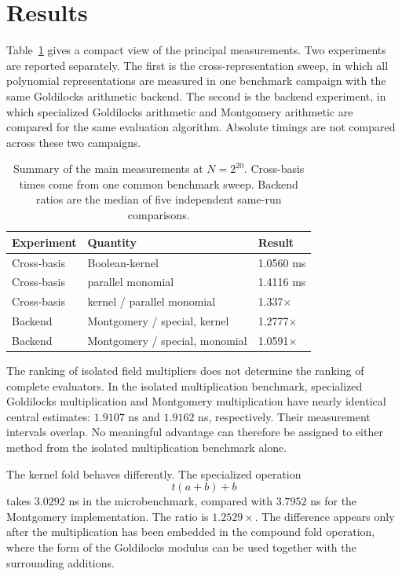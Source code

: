 
\section{Results}
\label{sec:results}

Table~\ref{tab:results-summary} gives a compact view of the principal
measurements.  Two experiments are reported separately.  The first is the
cross-representation sweep, in which all polynomial representations are
measured in one benchmark campaign with the same Goldilocks arithmetic
backend.  The second is the backend experiment, in which specialized
Goldilocks arithmetic and Montgomery arithmetic are compared for the same
evaluation algorithm.  Absolute timings are not compared across these two
campaigns.

\begin{table}[ht]
\centering
\caption{Summary of the main measurements at \(N=2^{20}\).  Cross-basis
times come from one common benchmark sweep.  Backend ratios are the median
of five independent same-run comparisons.}
\label{tab:results-summary}
\begin{tabular}{lll}
\toprule
Experiment & Quantity & Result\\
\midrule
Cross-basis &
Boolean-kernel &
1.0560 ms\\
Cross-basis &
parallel monomial &
1.4116 ms\\
Cross-basis &
kernel / parallel monomial &
1.337\(\times\)\\
Backend &
Montgomery / special, kernel &
1.2777\(\times\)\\
Backend &
Montgomery / special, monomial &
1.0591\(\times\)\\
\bottomrule
\end{tabular}
\end{table}

The ranking of isolated field multipliers does not determine the ranking
of complete evaluators.  In the isolated
multiplication benchmark, specialized Goldilocks multiplication and
Montgomery multiplication have nearly identical central estimates:
\(1.9107\) ns and \(1.9162\) ns, respectively.  Their measurement intervals
overlap.  No meaningful advantage can therefore be assigned to either
method from the isolated multiplication benchmark alone.

The kernel fold behaves differently.  The specialized operation
\[
t(a+b)+b
\]
takes \(3.0292\) ns in the microbenchmark, compared with \(3.7952\) ns for
the Montgomery implementation.  The ratio is \(1.2529\times\).  The
difference appears only after the multiplication has been embedded in the
compound fold operation, where the form of the Goldilocks modulus can be
used together with the surrounding additions.

